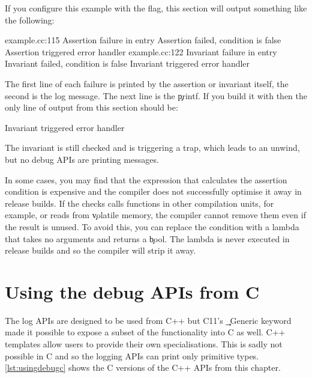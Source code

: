 {\codelisting[filename=examples/debug_helpers/example.cc,marker=asserts,label=lst:usingdebugasserts,caption="Assertions and invariants with the debugging APIs."]{}

If you configure this example with the  flag, this section will output something like the following:

\begin{console}
example.cc:115 Assertion failure in entry
Assertion failed, condition is false
Assertion triggered error handler
example.cc:122 Invariant failure in entry
Invariant failed, condition is false
Invariant triggered error handler
\end{console}

The first line of each failure is printed by the assertion or invariant itself, the second is the log message.
The next line is the \c{printf}.
If you build it with  then the only line of output from this section should be:

\begin{console}
Invariant triggered error handler
\end{console}

The invariant is still checked and is triggering a trap, which leads to an unwind, but no debug APIs are printing messages.

In some cases, you may find that the expression that calculates the assertion condition is expensive and the compiler does not successfully optimise it away in release builds.
If the checks calls functions in other compilation units, for example, or reads from \c{volatile} memory, the compiler cannot remove them even if the result is unused.
To avoid this, you can replace the condition with a lambda that takes no arguments and returns a \c{bool}.
The lambda is never executed in release builds and so the compiler will strip it away.

\section{Using the debug APIs from C}

The log APIs are designed to be used from C++ but C11's \c{_Generic} keyword made it possible to expose a subset of the functionality into C as well.
C++ templates allow users to provide their own specialisations.
This is sadly not possible in C and so the logging APIs can print only primitive types.
\ref{lst:usingdebugc} shows the C versions of the C++ APIs from this chapter.

}
